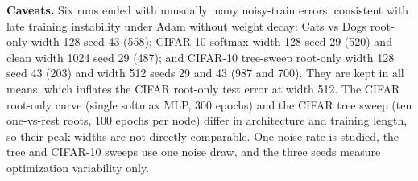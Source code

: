 \textbf{Caveats.} Six runs ended with unusually many noisy-train errors, consistent with late training instability under Adam without weight decay: Cats vs Dogs root-only width 128 seed 43 (558); CIFAR-10 softmax width 128 seed 29 (520) and clean width 1024 seed 29 (487); and CIFAR-10 tree-sweep root-only width 128 seed 43 (203) and width 512 seeds 29 and 43 (987 and 700). They are kept in all means, which inflates the CIFAR root-only test error at width 512. The CIFAR root-only curve (single softmax MLP, 300 epochs) and the CIFAR tree sweep (ten one-vs-rest roots, 100 epochs per node) differ in architecture and training length, so their peak widths are not directly comparable. One noise rate is studied, the tree and CIFAR-10 sweeps use one noise draw, and the three seeds measure optimization variability only.
